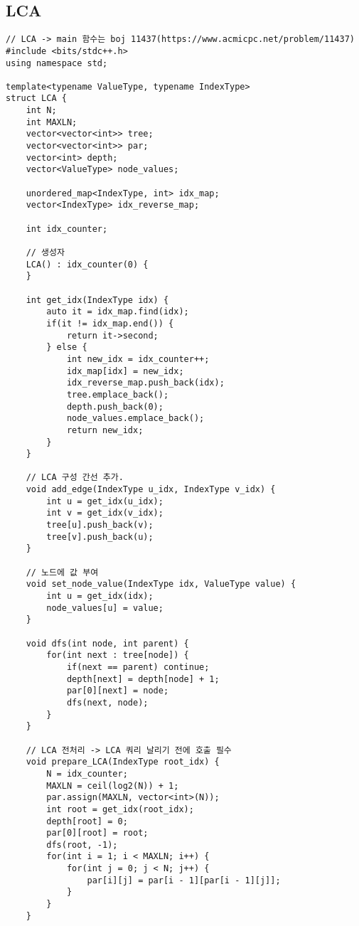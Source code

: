 \documentclass[landscape, 8pt, a4paper, oneside, twocolumn]{extarticle}
\begin{document}
    \subsection{LCA}
    \begin{verbatim}
// LCA -> main 함수는 boj 11437(https://www.acmicpc.net/problem/11437)
#include <bits/stdc++.h>
using namespace std;

template<typename ValueType, typename IndexType>
struct LCA {
    int N;
    int MAXLN;
    vector<vector<int>> tree;
    vector<vector<int>> par;
    vector<int> depth;
    vector<ValueType> node_values;

    unordered_map<IndexType, int> idx_map;
    vector<IndexType> idx_reverse_map;

    int idx_counter;

    // 생성자
    LCA() : idx_counter(0) {
    }

    int get_idx(IndexType idx) {
        auto it = idx_map.find(idx);
        if(it != idx_map.end()) {
            return it->second;
        } else {
            int new_idx = idx_counter++;
            idx_map[idx] = new_idx;
            idx_reverse_map.push_back(idx);
            tree.emplace_back();
            depth.push_back(0);
            node_values.emplace_back();
            return new_idx;
        }
    }

    // LCA 구성 간선 추가.
    void add_edge(IndexType u_idx, IndexType v_idx) {
        int u = get_idx(u_idx);
        int v = get_idx(v_idx);
        tree[u].push_back(v);
        tree[v].push_back(u);
    }

    // 노드에 값 부여
    void set_node_value(IndexType idx, ValueType value) {
        int u = get_idx(idx);
        node_values[u] = value;
    }

    void dfs(int node, int parent) {
        for(int next : tree[node]) {
            if(next == parent) continue;
            depth[next] = depth[node] + 1;
            par[0][next] = node;
            dfs(next, node);
        }
    }

    // LCA 전처리 -> LCA 쿼리 날리기 전에 호출 필수
    void prepare_LCA(IndexType root_idx) {
        N = idx_counter;
        MAXLN = ceil(log2(N)) + 1;
        par.assign(MAXLN, vector<int>(N));
        int root = get_idx(root_idx);
        depth[root] = 0;
        par[0][root] = root;
        dfs(root, -1);
        for(int i = 1; i < MAXLN; i++) {
            for(int j = 0; j < N; j++) {
                par[i][j] = par[i - 1][par[i - 1][j]];
            }
        }
    }


\end{verbatim}
\end{document}
